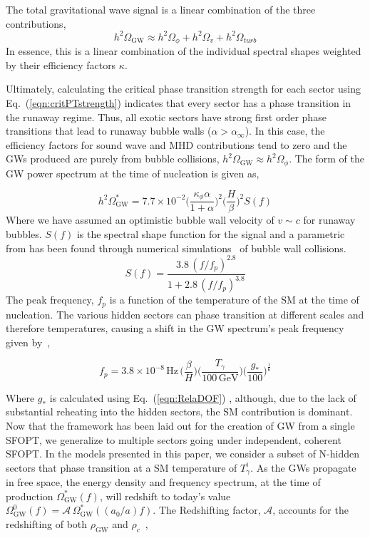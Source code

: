 \documentclass[nofootinbib,twocolumn,preprintnumbers]{revtex4-1}
\begin{document}
The total gravitational wave signal is a linear combination of the three contributions,
\begin{equation}
h^2\Omega_{\textrm{GW}} \approx h^2\Omega_{\phi} + h^2\Omega_{v} + h^2\Omega_{turb} 
\end{equation}
In essence, this is a linear combination of the individual spectral shapes weighted by their efficiency factors $\kappa$. 


Ultimately, calculating the critical phase transition strength for each sector using Eq.~(\ref{eqn:critPTstrength}) indicates that every sector has a phase transition in the runaway regime. Thus, all exotic sectors have strong first order phase transitions that lead to runaway bubble walls ($\alpha >\alpha_{\infty}$). In this case, the efficiency factors for sound wave and MHD contributions tend to zero and the GWs produced are purely from bubble collisions, $h^2\Omega_{\textrm{GW}} \approx h^2\Omega_{\phi}$.  The form of the GW power spectrum at the time of nucleation is given as,

\begin{equation}
h^2\Omega_{\textrm{GW}}^* = 7.7\times 10^{-2} \bigg( \frac{\kappa_{\phi} \alpha}{1 + \alpha} \bigg)^2 \bigg( \frac{H}{\beta} \bigg)^2  S(f)
\end{equation}
Where we have assumed an optimistic bubble wall velocity of $v \sim c$ for runaway bubbles. $S(f)$ is the spectral shape function for the signal and a parametric from has been found through numerical simulations~\cite{} of bubble wall collisions.
\begin{equation}\label{eqn::spectralshape}
S(f) = \frac{3.8 \,(f/f_p)^{2.8}}{1 + 2.8\,(f/f_p)^{3.8}}
\end{equation}
The peak frequency, $f_{p}$ is a function of the temperature of the SM at the time of nucleation.  The various hidden sectors can phase transition at different scales and therefore temperatures, causing a shift in the GW spectrum's peak frequency given by~\cite{},

\begin{equation}
f_{p} = 3.8 \times 10^{-8} \, \textrm{Hz}\, \bigg( \frac{\beta}{H}\bigg)\bigg(\frac{T_{\gamma}}{100 \, \textrm{GeV}}\bigg)\bigg(\frac{g_{*}}{100}\bigg)^{\frac{1}{6}}
\end{equation}

Where $g_*$  is calculated using Eq.~(\ref{eqn:RelaDOF}) , although, due to the lack of substantial reheating into the hidden sectors, the SM contribution is dominant. Now that the framework has been laid out for the creation of GW from a single SFOPT, we generalize to multiple sectors going under independent, coherent SFOPT. In the models presented in this paper, we consider a subset of N-hidden sectors that phase transition at a SM temperature of $T_{\gamma}^{i}$. As the GWs propagate in free space, the energy density and frequency spectrum, at the time of production $\Omega_{\textrm{GW}}^{*}(f)$, will redshift to today's value $\Omega_{\textrm{GW}}^{0}(f) = \mathcal{A}\, \Omega_{\textrm{GW}}^{*}((a_{0}/a) f) $. The Redshifting factor, $\mathcal{A}$, accounts for the redshifting of both $\rho_{\textrm{GW}} $ and $\rho_{c}$~\cite{},
\end{document}
